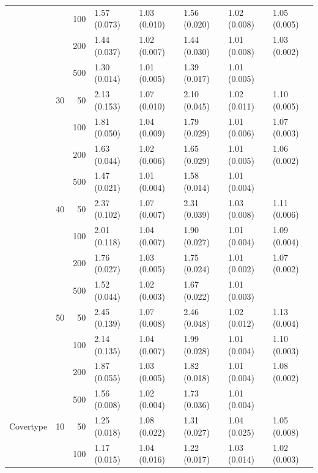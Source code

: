 \begin{longtable}{p{}lrlllll}
      &     & 100 &   1.57 (0.073) &   1.03 (0.010) &   1.56 (0.020) &         1.02 (0.008) &  1.05 (0.005) \\
      &     & 200 &   1.44 (0.037) &   1.02 (0.007) &   1.44 (0.030) &         1.01 (0.008) &  1.03 (0.002) \\
      &     & 500 &   1.30 (0.014) &   1.01 (0.005) &   1.39 (0.017) &         1.01 (0.005) &            \\
      & 30  & 50  &   2.13 (0.153) &   1.07 (0.010) &   2.10 (0.045) &         1.02 (0.011) &  1.10 (0.005) \\
      &     & 100 &   1.81 (0.050) &   1.04 (0.009) &   1.79 (0.029) &         1.01 (0.006) &  1.07 (0.003) \\
      &     & 200 &   1.63 (0.044) &   1.02 (0.006) &   1.65 (0.029) &         1.01 (0.005) &  1.06 (0.002) \\
      &     & 500 &   1.47 (0.021) &   1.01 (0.004) &   1.58 (0.014) &         1.01 (0.004) &            \\
      & 40  & 50  &   2.37 (0.102) &   1.07 (0.007) &   2.31 (0.039) &         1.03 (0.008) &  1.11 (0.006) \\
      &     & 100 &   2.01 (0.118) &   1.04 (0.007) &   1.90 (0.027) &         1.01 (0.004) &  1.09 (0.004) \\
      &     & 200 &   1.76 (0.027) &   1.03 (0.005) &   1.75 (0.024) &         1.01 (0.002) &  1.07 (0.002) \\
      &     & 500 &   1.52 (0.044) &   1.02 (0.003) &   1.67 (0.022) &         1.01 (0.003) &            \\
      & 50  & 50  &   2.45 (0.139) &   1.07 (0.008) &   2.46 (0.048) &         1.02 (0.012) &  1.13 (0.004) \\
      &     & 100 &   2.14 (0.135) &   1.04 (0.007) &   1.99 (0.028) &         1.01 (0.004) &  1.10 (0.003) \\
      &     & 200 &   1.87 (0.055) &   1.03 (0.005) &   1.82 (0.018) &         1.01 (0.004) &  1.08 (0.002) \\
      &     & 500 &   1.56 (0.008) &   1.02 (0.004) &   1.73 (0.036) &         1.01 (0.004) &            \\
\midrule
Covertype & 10  & 50  &   1.25 (0.018) &   1.08 (0.022) &   1.31 (0.027) &         1.04 (0.025) &  1.05 (0.008) \\
      &     & 100 &   1.17 (0.015) &   1.04 (0.016) &   1.22 (0.017) &         1.03 (0.014) &  1.02 (0.003) \\

\end{longtable}
